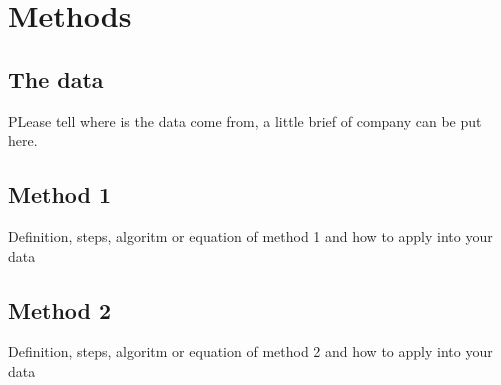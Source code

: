 \chapter{Methods}

\section{The data}
PLease tell where is the data come from, a little brief of company can be put here.

\section{Method 1}
Definition, steps, algoritm or equation of method 1 and how to apply into your data
\section{Method 2}
Definition, steps, algoritm or equation of method 2 and how to apply into your data

